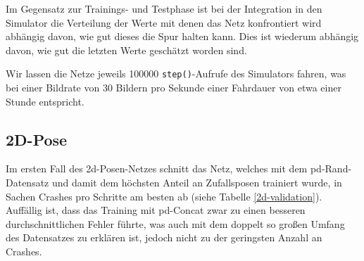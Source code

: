 Im Gegensatz zur Trainings- und Testphase ist bei der Integration in den Simulator die Verteilung der Werte mit denen das Netz konfrontiert wird abhängig davon, wie gut dieses die Spur halten kann. Dies ist wiederum abhängig davon, wie gut die letzten Werte geschätzt worden sind.

Wir lassen die Netze jeweils 100000 \texttt{step()}-Aufrufe des Simulators fahren, was bei einer Bildrate von 30 Bildern pro Sekunde einer Fahrdauer von etwa einer Stunde entspricht.\\

\subsection{2D-Pose}

Im ersten Fall des \acs{2d}-Posen-Netzes schnitt das Netz, welches mit dem \glqq\acs{pd}-Rand\grqq-Datensatz und damit dem höchsten Anteil an Zufallsposen trainiert wurde, in Sachen Crashes pro Schritte am besten ab (siehe Tabelle \ref{2d-validation}). Auffällig ist, dass das Training mit \glqq\acs{pd}-Concat\grqq{} zwar zu einen besseren durchschnittlichen Fehler führte, was auch mit dem doppelt so großen Umfang des Datensatzes zu erklären ist, jedoch nicht zu der geringsten Anzahl an Crashes.  

